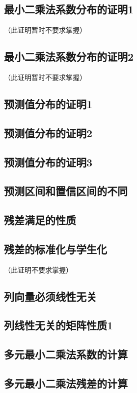\documentclass[UTF8]{ctexbook}
\begin{document}
\subsection{最小二乘法系数分布的证明1}
\label{proof19}
（此证明暂时不要求掌握）

\subsection{最小二乘法系数分布的证明2}
\label{proof20}
（此证明暂时不要求掌握）

\subsection{预测值分布的证明1}
\label{proof21}

\subsection{预测值分布的证明2}
\label{proof22}

\subsection{预测值分布的证明3}
\label{proof23}

\subsection{预测区间和置信区间的不同}
\label{proof24}

\subsection{残差满足的性质}
\label{proof25}

\subsection{残差的标准化与学生化}
\label{proof26}
（此证明不要求掌握）

\subsection{列向量必须线性无关}
\label{proof27}

\subsection{列线性无关的矩阵性质1}
\label{proof28}

\subsection{多元最小二乘法系数的计算}
\label{proof29}

\subsection{多元最小二乘法残差的计算}
\label{proof30}
\end{document}
